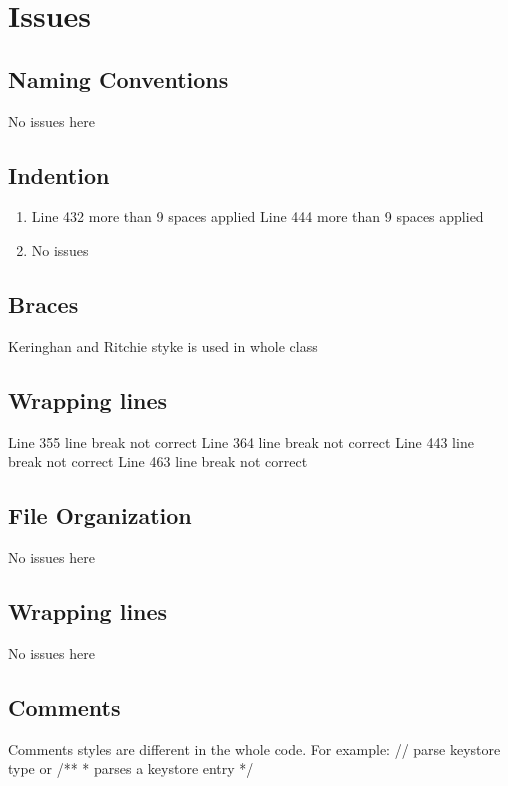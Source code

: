 \documentclass[12pt, oneside]{book}   	%
\begin{document}
\chapter{Issues}
\section{Naming Conventions}
No issues here
\section{Indention}
\begin{enumerate}
\item Line 432 more than 9 spaces applied
\newline  Line 444 more than 9 spaces applied
\item No issues
\end{enumerate}
\section{Braces}
Keringhan and Ritchie styke is used in whole class 
\section{Wrapping lines}
Line 355 line break not correct 
\newline
Line 364 line break not correct 
\newline
Line 443 line break not correct 
\newline
Line 463 line break not correct 
\section{File Organization}
No issues here
\section{Wrapping lines}
No issues here
\section{Comments}
Comments styles are different in the whole code. For example: 
\newline
\newline
// parse keystore type 
\newline
\newline
or
\newline
\newline
/**
\newline    
* parses a keystore entry
\newline 
*/
\end{document}
